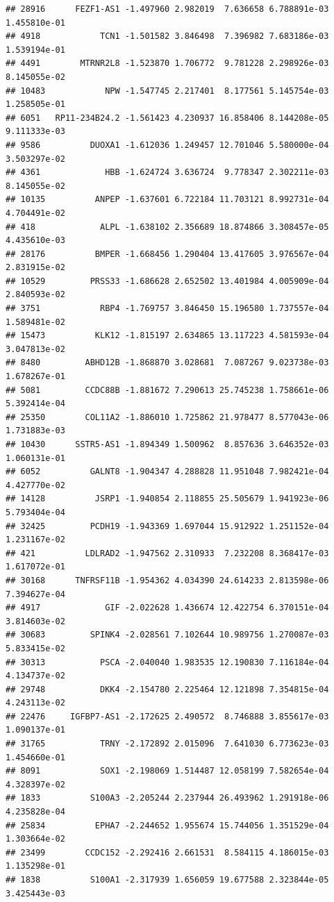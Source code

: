 \documentclass[
]{article}
\begin{document}
\begin{verbatim}
## 28916      FEZF1-AS1 -1.497960 2.982019  7.636658 6.788891e-03 1.455810e-01
## 4918            TCN1 -1.501582 3.846498  7.396982 7.683186e-03 1.539194e-01
## 4491        MTRNR2L8 -1.523870 1.706772  9.781228 2.298926e-03 8.145055e-02
## 10483            NPW -1.547745 2.217401  8.177561 5.145754e-03 1.258505e-01
## 6051   RP11-234B24.2 -1.561423 4.230937 16.858406 8.144208e-05 9.111333e-03
## 9586          DUOXA1 -1.612036 1.249457 12.701046 5.580000e-04 3.503297e-02
## 4361             HBB -1.624724 3.636724  9.778347 2.302211e-03 8.145055e-02
## 10135          ANPEP -1.637601 6.722184 11.703121 8.992731e-04 4.704491e-02
## 418             ALPL -1.638102 2.356689 18.874866 3.308457e-05 4.435610e-03
## 28176          BMPER -1.668456 1.290404 13.417605 3.976567e-04 2.831915e-02
## 10529         PRSS33 -1.686628 2.652502 13.401984 4.005909e-04 2.840593e-02
## 3751            RBP4 -1.769757 3.846450 15.196580 1.737557e-04 1.589481e-02
## 15473          KLK12 -1.815197 2.634865 13.117223 4.581593e-04 3.047813e-02
## 8480         ABHD12B -1.868870 3.028681  7.087267 9.023738e-03 1.678267e-01
## 5081         CCDC88B -1.881672 7.290613 25.745238 1.758661e-06 5.392414e-04
## 25350        COL11A2 -1.886010 1.725862 21.978477 8.577043e-06 1.731883e-03
## 10430      SSTR5-AS1 -1.894349 1.500962  8.857636 3.646352e-03 1.060131e-01
## 6052          GALNT8 -1.904347 4.288828 11.951048 7.982421e-04 4.427770e-02
## 14128          JSRP1 -1.940854 2.118855 25.505679 1.941923e-06 5.793404e-04
## 32425         PCDH19 -1.943369 1.697044 15.912922 1.251152e-04 1.231167e-02
## 421          LDLRAD2 -1.947562 2.310933  7.232208 8.368417e-03 1.617072e-01
## 30168      TNFRSF11B -1.954362 4.034390 24.614233 2.813598e-06 7.394627e-04
## 4917             GIF -2.022628 1.436674 12.422754 6.370151e-04 3.814603e-02
## 30683         SPINK4 -2.028561 7.102644 10.989756 1.270087e-03 5.833415e-02
## 30313           PSCA -2.040040 1.983535 12.190830 7.116184e-04 4.134737e-02
## 29748           DKK4 -2.154780 2.225464 12.121898 7.354815e-04 4.243113e-02
## 22476     IGFBP7-AS1 -2.172625 2.490572  8.746888 3.855617e-03 1.090137e-01
## 31765           TRNY -2.172892 2.015096  7.641030 6.773623e-03 1.454660e-01
## 8091            SOX1 -2.198069 1.514487 12.058199 7.582654e-04 4.328397e-02
## 1833          S100A3 -2.205244 2.237944 26.493962 1.291918e-06 4.235828e-04
## 25834          EPHA7 -2.244652 1.955674 15.744056 1.351529e-04 1.303664e-02
## 23499        CCDC152 -2.292416 2.661531  8.584115 4.186015e-03 1.135298e-01
## 1838          S100A1 -2.317939 1.656059 19.677588 2.323844e-05 3.425443e-03

\end{verbatim}
\end{document}
